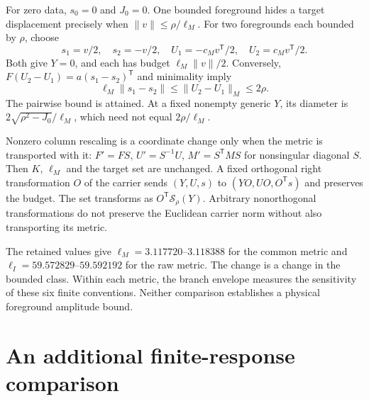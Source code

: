 \documentclass[aps,prd,onecolumn,11pt,nofootinbib,notitlepage]{revtex4-2}
\begin{document}
For zero data, $s_0=0$ and $J_0=0$. One bounded foreground hides a target displacement precisely when $\|v\|\le\rho/\ell_M$. For two foregrounds each bounded by $\rho$, choose
\begin{equation}
 s_1=v/2,\quad s_2=-v/2,\quad
 U_1=-c_Mv^{\mathsf T}/2,\quad U_2=c_Mv^{\mathsf T}/2.
\end{equation}
Both give $Y=0$, and each has budget $\ell_M\|v\|/2$. Conversely, $F(U_2-U_1)=a(s_1-s_2)^{\mathsf T}$ and minimality imply
\begin{equation}
 \ell_M\|s_1-s_2\|\le\|U_2-U_1\|_M\le2\rho.
\end{equation}
The pairwise bound is attained. At a fixed nonempty generic $Y$, its diameter is $2\sqrt{\rho^2-J_0}/\ell_M$, which need not equal $2\rho/\ell_M$.

Nonzero column rescaling is a coordinate change only when the metric is transported with it: $F'=FS$, $U'=S^{-1}U$, $M'=S^{\mathsf T}MS$ for nonsingular diagonal $S$. Then $K$, $\ell_M$ and the target set are unchanged. A fixed orthogonal right transformation $O$ of the carrier sends $(Y,U,s)$ to $(YO,UO,O^{\mathsf T}s)$ and preserves the budget. The set transforms as $O^{\mathsf T}\mathcal S_\rho(Y)$. Arbitrary nonorthogonal transformations do not preserve the Euclidean carrier norm without also transporting its metric.

\begin{table}[t]
\caption{Source-bound six-branch minimum budgets and frontier slopes. The common metric is fixed across branches; the identity metric defines a different coefficient class. These are finite algebraic quantities, not measured CMB amplitudes.}
\centering
{}
\label{tab:budgets}
\end{table}

The retained values give $\ell_M=3.117720$--$3.118388$ for the common metric and $\ell_I=59.572829$--$59.592192$ for the raw metric. The change is a change in the bounded class. Within each metric, the branch envelope measures the sensitivity of these six finite conventions. Neither comparison establishes a physical foreground amplitude bound.

\section{An additional finite-response comparison}
\end{document}
